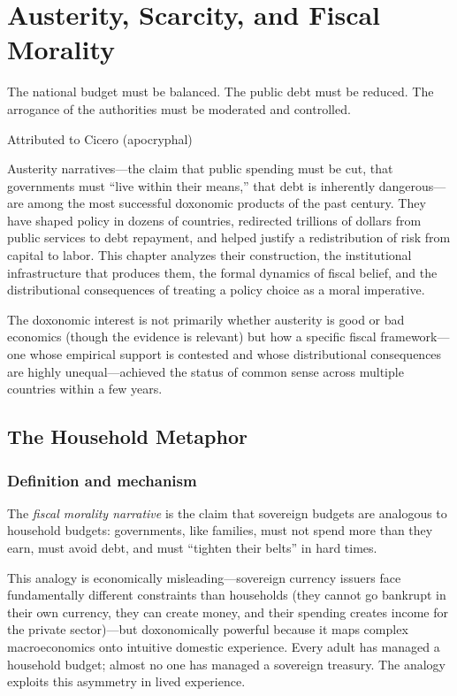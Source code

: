 \chapter{Austerity, Scarcity, and Fiscal Morality}
\label{ch:austerity}

\epigraph{The national budget must be balanced. The public debt must be reduced. The arrogance of the authorities must be moderated and controlled.}{Attributed to Cicero (apocryphal)}

\noindent
Austerity narratives---the claim that public spending must be cut, that governments must ``live within their means,'' that debt is inherently dangerous---are among the most successful doxonomic products of the past century.
They have shaped policy in dozens of countries, redirected trillions of dollars from public services to debt repayment, and helped justify a redistribution of risk from capital to labor.
This chapter analyzes their construction, the institutional infrastructure that produces them, the formal dynamics of fiscal belief, and the distributional consequences of treating a policy choice as a moral imperative.

The doxonomic interest is not primarily whether austerity is good or bad economics (though the evidence is relevant) but how a specific fiscal framework---one whose empirical support is contested and whose distributional consequences are highly unequal---achieved the status of common sense across multiple countries within a few years.

\section{The Household Metaphor}
\label{sec:ch25-household}

\subsection{Definition and mechanism}

\begin{definition}
\label{def:fiscal-morality}
The \emph{fiscal morality narrative} is the claim that sovereign budgets are analogous to household budgets: governments, like families, must not spend more than they earn, must avoid debt, and must ``tighten their belts'' in hard times.
\end{definition}

This analogy is economically misleading---sovereign currency issuers face fundamentally different constraints than households (they cannot go bankrupt in their own currency, they can create money, and their spending creates income for the private sector)---but doxonomically powerful because it maps complex macroeconomics onto intuitive domestic experience.
Every adult has managed a household budget; almost no one has managed a sovereign treasury.
The analogy exploits this asymmetry in lived experience.

